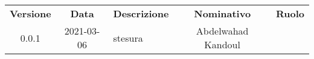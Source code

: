 {
    \renewcommand{\arraystretch}{1.5}
    \centering
    \begin{longtable}{ c c  C{4cm}  c  c }
        \rowcolor{\primaryColor}
        \textcolor{\secondaryColor}{
        \textbf{Versione}}     & \textcolor{\secondaryColor}{\textbf{Data}}       & \textcolor{\secondaryColor}
        {\textbf{Descrizione}} & \textcolor{\secondaryColor}{\textbf{Nominativo}} & \textcolor{\secondaryColor}{\textbf{Ruolo}}                          \\


        0.0.1                  & 2021-03-06                                      & stesura                            & Abdelwahad Kandoul & \redattore{}    \\
    \end{longtable}
}